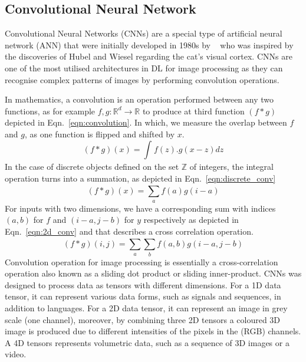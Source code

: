 \subsection{Convolutional Neural Network} 
Convolutional Neural Networks (CNNs) are a special type of artificial neural network (ANN) that were initially developed in 1980s by ~\textcite{Fukushima1980} who was inspired by the discoveries of Hubel and Wiesel regarding the cat's visual cortex. 
CNNs are one of the most utilised architectures in DL for image processing as they can recognise complex patterns of images by performing convolution operations.

In mathematics, a convolution is an operation performed between any two functions, as for example \(f, g:\mathbb{R}^{d} \to \mathbb{R}\) to produce at third function \((f\ast g)\) depicted in Eqn.~\ref{eqn:convolution}.
In which, we measure the overlap between \(f\) and \(g\), as one function is flipped and shifted by \(x\).
\begin{equation}
	(f\ast g)(x) = \int_{}^{} f(z).g(x-z)dz
	\label{eqn:convolution}
\end{equation}
In the case of discrete objects defined on the set \(\mathbb{Z}\) of integers, the integral operation turns into a summation,  as depicted in Eqn.~\ref{eqn:discrete_conv}
\begin{equation}		
	(f\ast g)(x) = \sum_{a}^{} f(a)g(i-a)
	\label{eqn:discrete_conv}
\end{equation}
For inputs with two dimensions, we have a corresponding sum with indices \((a,b)\) for \(f\) and \((i-a, j-b)\) for \(y\) respectively as depicted in Eqn.~\ref{eqn:2d_conv} and that describes a cross correlation operation.
\begin{equation}
	(f\ast g)(i,j) = \sum_{a}^{}\sum_{b}^{}f(a,b)g(i-a,j-b)
	\label{eqn:2d_conv}
\end{equation}
Convolution operation for image processing is essentially a cross-correlation operation also known as a sliding dot product or sliding inner-product. 
CNNs was designed to process data as tensors with different dimensions. 
For a 1D data tensor, it can represent various data forms, such as signals and sequences, in addition to languages.
For a 2D data tensor, it can represent an image in grey scale (one channel),
moreover, by combining three 2D tensors a coloured 3D image is produced due to different intensities of the pixels in the (RGB) channels.
A 4D tensors represents volumetric data, such as a sequence of 3D images  or a video.

